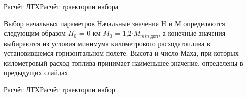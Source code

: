 \begin{frame}{Расчёт ЛТХ}{Расчёт траектории набора}
    \begin{block}{Выбор начальных параметров}
        Начальные значения H и М определяются следующим образом $H_0$ = 0 км $M_0$ = 1,2$\cdot M_{min \ \text{доп}}$, а конечные значения выбираются из
        условия минимума километрового расходатоплива в установившемся горизонтальном полете. Высота и число Маха, при которых километровый расход 
        топлива принимает наименьшее значение, определены в предыдущих слайдах 
    \end{block}
\end{frame}

\begin{frame}{Расчёт ЛТХ}{Расчёт траектории набор}
    \begin{minipage}[c]{0.45\textwidth}
    \end{minipage}
    \begin{minipage}[c]{0.45\textwidth}
    \end{minipage}
\end{frame}
 
